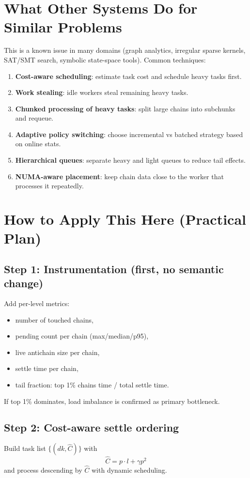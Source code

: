 \documentclass[11pt,a4paper]{article}
\begin{document}
\section{What Other Systems Do for Similar Problems}
This is a known issue in many domains (graph analytics, irregular sparse kernels, SAT/SMT search, symbolic state-space tools).
Common techniques:
\begin{enumerate}
  \item \textbf{Cost-aware scheduling}: estimate task cost and schedule heavy tasks first.
  \item \textbf{Work stealing}: idle workers steal remaining heavy tasks.
  \item \textbf{Chunked processing of heavy tasks}: split large chains into subchunks and requeue.
  \item \textbf{Adaptive policy switching}: choose incremental vs batched strategy based on online stats.
  \item \textbf{Hierarchical queues}: separate heavy and light queues to reduce tail effects.
  \item \textbf{NUMA-aware placement}: keep chain data close to the worker that processes it repeatedly.
\end{enumerate}

\section{How to Apply This Here (Practical Plan)}
\subsection*{Step 1: Instrumentation (first, no semantic change)}
Add per-level metrics:
\begin{itemize}
  \item number of touched chains,
  \item pending count per chain (max/median/p95),
  \item live antichain size per chain,
  \item settle time per chain,
  \item tail fraction: top 1\% chains time / total settle time.
\end{itemize}

If top 1\% dominates, load imbalance is confirmed as primary bottleneck.

\subsection*{Step 2: Cost-aware settle ordering}
Build task list $\{(dk, \hat C)\}$ with
\[
\hat C = p \cdot l + \gamma p^2
\]
and process descending by $\hat C$ with dynamic scheduling.
\end{document}
